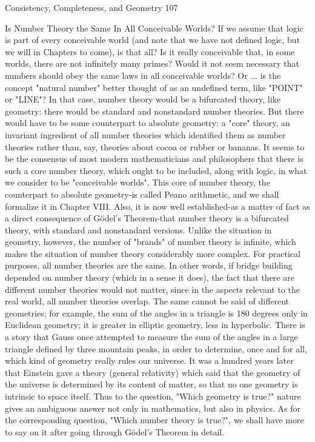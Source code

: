 Consistency, Completeness, and Geometry                                                    107

         Is Number Theory the Same In All Conceivable Worlds?
         If we assume that logic is part of every conceivable world (and note that we have
not defined logic, but we will in Chapters to come), is that all? Is it really conceivable
that, in some worlds, there are not infinitely many primes? Would it not seem necessary
that numbers should obey the same laws in all conceivable worlds? Or ... is the concept
"natural number" better thought of as an undefined term, like "POINT" or "LINE"? In
that case, number theory would be a bifurcated theory, like geometry: there would be
standard and nonstandard number theories. But there would have to be some counterpart
to absolute geometry: a "core" theory, an invariant ingredient of all number theories
which identified them as number theories rather than, say, theories about cocoa or rubber
or bananas. It seems to be the consensus of most modern mathematicians and
philosophers that there is such a core number theory, which ought to be included, along
with logic, in what we consider to be "conceivable worlds". This core of number theory,
the counterpart to absolute geometry-is called Peano arithmetic, and we shall formalize it
in Chapter VIII. Also, it is now well established-as a matter of fact as a direct
consequence of Gödel’s Theorem-that number theory is a bifurcated theory, with
standard and nonstandard versions. Unlike the situation in geometry, however, the
number of "brands" of number theory is infinite, which makes the situation of number
theory considerably more complex.
         For practical purposes, all number theories are the same. In other words, if bridge
building depended on number theory (which in a sense it does), the fact that there are
different number theories would not matter, since in the aspects relevant to the real world,
all number theories overlap. The same cannot be said of different geometries; for
example, the sum of the angles in a triangle is 180 degrees only in Euclidean geometry; it
is greater in elliptic geometry, less in hyperbolic. There is a story that Gauss once
attempted to measure the sum of the angles in a large triangle defined by three mountain
peaks, in order to determine, once and for all, which kind of geometry really rules our
universe. It was a hundred years later that Einstein gave a theory (general relativity)
which said that the geometry of the universe is determined by its content of matter, so
that no one geometry is intrinsic to space itself. Thus to the question, "Which geometry is
true?" nature gives an ambiguous answer not only in mathematics, but also in physics. As
for the corresponding question, "Which number theory is true?", we shall have more to
say on it after going through Gödel’s Theorem in detail.

